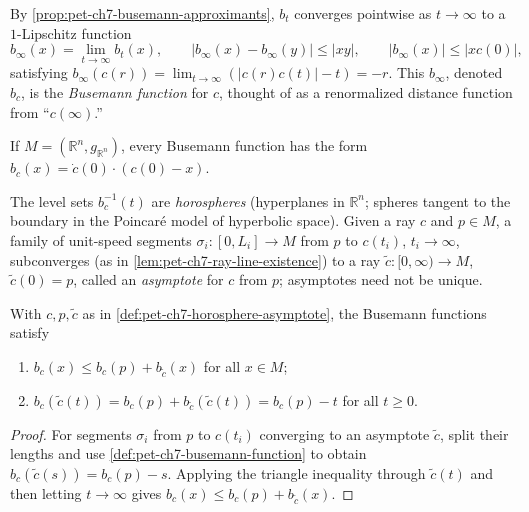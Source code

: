 \begin{definition}
  \label{def:pet-ch7-busemann-function}
  By \cref{prop:pet-ch7-busemann-approximants}, $b_t$ converges pointwise as
  $t\to\infty$ to a $1$-Lipschitz function
  \[
    b_\infty(x)=\lim_{t\to\infty}b_t(x),\qquad |b_\infty(x)-b_\infty(y)|\le|xy|,
    \qquad |b_\infty(x)|\le|xc(0)|,
  \]
  satisfying $b_\infty(c(r))=\lim_{t\to\infty}(|c(r)c(t)|-t)=-r$. This
  $b_\infty$, denoted $b_c$, is the \emph{Busemann function} for $c$, thought
  of as a renormalized distance function from ``$c(\infty)$.''
\end{definition}

\begin{example}
  \label{ex:pet-ch7-euclidean-busemann}
  If $M=(\mathbb{R}^n,g_{\mathbb{R}^n})$, every Busemann function has the form
  $b_c(x)=\dot c(0)\cdot(c(0)-x)$.
\end{example}

\begin{definition}
  \label{def:pet-ch7-horosphere-asymptote}
  The level sets $b_c^{-1}(t)$ are \emph{horospheres} (hyperplanes in $\mathbb{R}^n$;
  spheres tangent to the boundary in the Poincaré model of hyperbolic space).
  Given a ray $c$ and $p\in M$, a family of unit-speed segments
  $\sigma_i:[0,L_i]\to M$ from $p$ to $c(t_i)$, $t_i\to\infty$, subconverges (as
  in \cref{lem:pet-ch7-ray-line-existence}) to a ray $\tilde c:[0,\infty)\to
  M$, $\tilde c(0)=p$, called an \emph{asymptote} for $c$ from $p$; asymptotes
  need not be unique.
\end{definition}

\begin{proposition}
  \label{prop:pet-ch7-busemann-asymptote-relation}
  With $c,p,\tilde c$ as in \cref{def:pet-ch7-horosphere-asymptote}, the
  Busemann functions satisfy
  \begin{enumerate}
    \item[(1)] $b_c(x)\le b_c(p)+b_{\tilde c}(x)$ for all $x\in M$;
    \item[(2)] $b_c(\tilde c(t))=b_c(p)+b_{\tilde c}(\tilde c(t))=b_c(p)-t$ for
      all $t\ge0$.
  \end{enumerate}
\end{proposition}
\begin{proof}
  \sketch
  For segments \(\sigma_i\) from \(p\) to \(c(t_i)\) converging to an asymptote \(\widetilde c\), split their lengths and use \cref{def:pet-ch7-busemann-function} to obtain \(b_c(\widetilde c(s))=b_c(p)-s\). Applying the triangle inequality through \(\widetilde c(t)\) and then letting \(t\to\infty\) gives \(b_c(x)\le b_c(p)+b_{\widetilde c}(x)\).
\end{proof}

